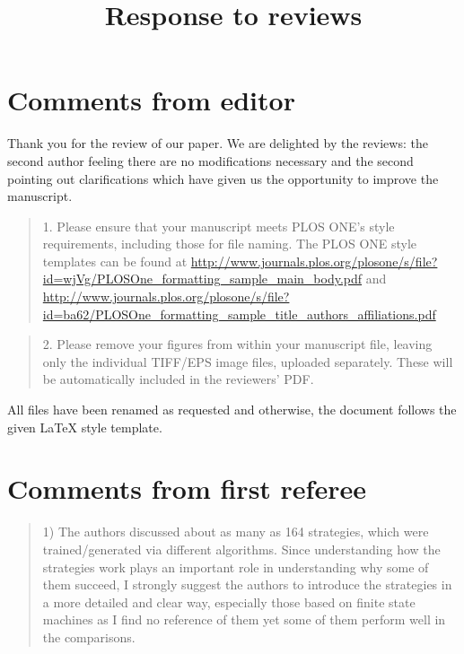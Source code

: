 \documentclass[a4]{article}
\title{Response to reviews}
\begin{document}
\maketitle

\section{Comments from editor}

Thank you for the review of our paper. We are delighted by the reviews: the
second author feeling there are no modifications necessary and the second
pointing out clarifications which have given us the opportunity to improve the
manuscript.

\begin{quote}
	1. Please ensure that your manuscript meets PLOS ONE's style requirements,
	including those for file naming. The PLOS ONE style templates can be found at
	\url{http://www.journals.plos.org/plosone/s/file?id=wjVg/PLOSOne_formatting_sample_main_body.pdf}
	and
	\url{http://www.journals.plos.org/plosone/s/file?id=ba62/PLOSOne_formatting_sample_title_authors_affiliations.pdf}
\end{quote}

\begin{quote}
    2. Please remove your figures from within your manuscript file, leaving only
    the individual TIFF/EPS image files, uploaded separately.  These will be
    automatically included in the reviewers’ PDF.
\end{quote}

All files have been renamed as requested and otherwise, the document follows the
given LaTeX style template.

\section{Comments from first referee}

\begin{quote}
    1) The authors discussed about as many as 164 strategies, which were
    trained/generated via different algorithms. Since understanding how the
    strategies work plays an important role in understanding why some of them
    succeed, I strongly suggest the authors to introduce the strategies in a more
    detailed and clear way, especially those based on finite state machines as I
    find no reference of them yet some of them perform well in the comparisons.
\end{quote}
\end{document}
